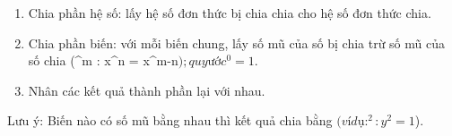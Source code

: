 \begin{enumerate}
\item Chia phần hệ số: lấy hệ số đơn thức bị chia chia cho hệ số đơn thức chia.
\item Chia phần biến: với mỗi biến chung, lấy số mũ của số bị chia trừ số mũ của số chia (^m : x^n = x^{m-n}$); quy ước ^0 = 1$.
\item Nhân các kết quả thành phần lại với nhau.
\end{enumerate}
Lưu ý: Biến nào có số mũ bằng nhau thì kết quả chia bằng $ (ví dụ: ^2 : y^2 = 1$).
